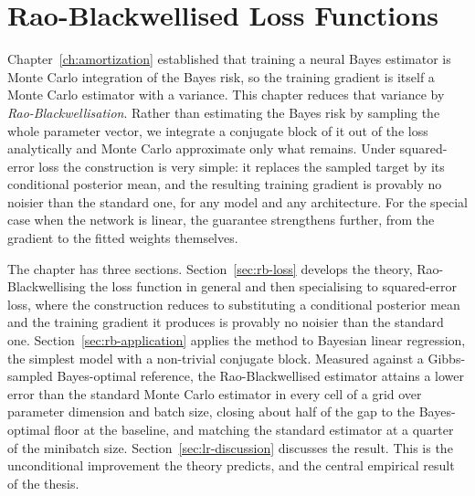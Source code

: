 
\chapter{Rao-Blackwellised Loss Functions}
\label{ch:rao-blackwell}

Chapter~\ref{ch:amortization} established that training a neural Bayes
estimator is Monte Carlo integration of the Bayes risk, so the
training gradient is itself a Monte Carlo estimator with a variance.
This chapter reduces that variance by \emph{Rao-Blackwellisation}.
Rather than estimating the Bayes risk by sampling the whole parameter
vector, we integrate a conjugate block of it out of the loss
analytically and Monte Carlo approximate only what remains. Under
squared-error loss the construction is very simple: it
replaces the sampled target by its conditional posterior mean, and
the resulting training gradient is provably no noisier than the
standard one, for any model and any architecture. For the special case when the network is linear,
the guarantee strengthens further, from the gradient to the fitted
weights themselves.

The chapter has three sections.
Section~\ref{sec:rb-loss} develops the theory, Rao-Blackwellising the
loss function in general and then specialising to squared-error loss,
where the construction reduces to substituting a conditional posterior
mean and the training gradient it produces is provably no noisier than
the standard one.
Section~\ref{sec:rb-application} applies the method to Bayesian linear
regression, the simplest model with a non-trivial conjugate block.
Measured against a Gibbs-sampled Bayes-optimal reference, the
Rao-Blackwellised estimator attains a lower error than the standard
Monte Carlo estimator in every cell of a grid over parameter dimension
and batch size, closing about half of the gap to the Bayes-optimal
floor at the baseline, and matching the standard estimator at a quarter
of the minibatch size.
Section~\ref{sec:lr-discussion} discusses the result. This is the
unconditional improvement the theory predicts, and the central
empirical result of the thesis.



